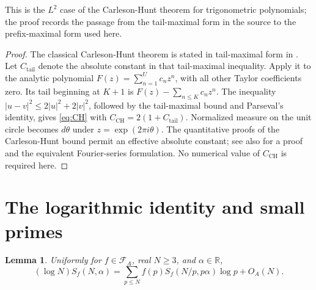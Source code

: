 \documentclass[11pt]{amsart}
\numberwithin{equation}{section}
\numberwithin{figure}{section}
\newtheorem{lemma}{Lemma}[section]
\theoremstyle{definition}
\newcommand{\R}{\mathbb{R}}
\newcommand{\FA}{\mathcal F_A}
\begin{document}
This is the $L^2$ case of the Carleson-Hunt theorem \cite{C,H} for
trigonometric polynomials; the proof records the passage from the
tail-maximal form in the source to the prefix-maximal form used here.

\begin{proof}
The classical Carleson-Hunt theorem is stated in tail-maximal form in
\cite[Theorem~1.2, p.~87]{HS}. Let $C_\mathrm{tail}$ denote the absolute
constant in that tail-maximal inequality. Apply it to the analytic
polynomial $F(z)=\sum_{n=1}^U c_nz^n$, with all other Taylor
coefficients zero. Its tail beginning at $K+1$ is
$F(z)-\sum_{n\le K}c_nz^n$.
The inequality $|u-v|^2\le2|u|^2+2|v|^2$, followed by the tail-maximal
bound and Parseval's identity, gives \eqref{eq:CH} with
$C_\mathrm{CH}=2(1+C_\mathrm{tail})$.
Normalized measure on the unit circle becomes $d\theta$ under
$z=\exp(2\pi i\theta)$. The quantitative proofs of the
Carleson-Hunt bound permit an effective absolute constant; see also
\cite{Lacey} for a proof and the equivalent
Fourier-series formulation. No numerical value of $C_\mathrm{CH}$ is
required here.
\end{proof}

\section{The logarithmic identity and small primes}\label{sec:small}

\begin{lemma}\label{lem:log}
Uniformly for $f\in\FA$, real $N\ge3$, and $\alpha\in\R$,
\begin{equation}\label{eq:log-identity}
 (\log N)S_f(N,\alpha)
 =\sum_{p\le N}f(p)S_f(N/p,p\alpha)\log p+O_A(N).
\end{equation}
\end{lemma}
\end{document}
